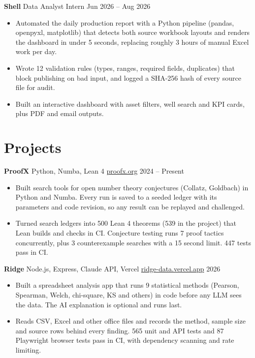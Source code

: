 \documentclass[10pt,letterpaper]{article}
\newcommand{\entry}[2]{%
  \par\noindent #1 \hfill {\color{soft}\small #2}\par
  \vspace{0.12em}
}
\begin{document}
\vspace{0.25em}
\entry{\textbf{Shell} \textbar{} Data Analyst Intern}{Jun 2026 -- Aug 2026}
\begin{itemize}
  \item Automated the daily production report with a Python pipeline (pandas, openpyxl, matplotlib) that detects both
        source workbook layouts and renders the dashboard in under 5 seconds, replacing roughly 3 hours of manual Excel work per day.
  \item Wrote 12 validation rules (types, ranges, required fields, duplicates) that block publishing on bad input, and
        logged a SHA-256 hash of every source file for audit.
  \item Built an interactive dashboard with asset filters, well search and KPI cards, plus PDF and email outputs.
\end{itemize}

\section{Projects}

\entry{\textbf{ProofX} \textbar{} Python, Numba, Lean 4 \textbar{} \href{https://proofx.org}{proofx.org}}{2024 -- Present}
\begin{itemize}
  \item Built search tools for open number theory conjectures (Collatz, Goldbach) in Python and Numba. Every run is saved
        to a seeded ledger with its parameters and code revision, so any result can be replayed and challenged.
  \item Turned search ledgers into 500 Lean 4 theorems (539 in the project) that Lean builds and checks in CI. Conjecture
        testing runs 7 proof tactics concurrently, plus 3 counterexample searches with a 15 second limit. 447 tests pass in CI.
\end{itemize}

\vspace{0.25em}
\entry{\textbf{Ridge} \textbar{} Node.js, Express, Claude API, Vercel \textbar{} \href{https://ridge-data.vercel.app}{ridge-data.vercel.app}}{2026}
\begin{itemize}
  \item Built a spreadsheet analysis app that runs 9 statistical methods (Pearson, Spearman, Welch, chi-square, KS
        and others) in code before any LLM sees the data. The AI explanation is optional and runs last.
  \item Reads CSV, Excel and other office files and records the method, sample size and source rows behind every
        finding. 565 unit and API tests and 87 Playwright browser tests pass in CI, with dependency scanning and rate limiting.
\end{itemize}
\end{document}
